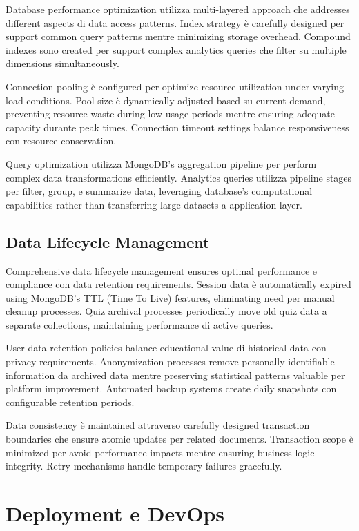 \documentclass[12pt,a4paper]{article}
\begin{document}
Database performance optimization utilizza multi-layered approach che addresses different aspects di data access patterns. Index strategy è carefully designed per support common query patterns mentre minimizing storage overhead. Compound indexes sono created per support complex analytics queries che filter su multiple dimensions simultaneously.

Connection pooling è configured per optimize resource utilization under varying load conditions. Pool size è dynamically adjusted based su current demand, preventing resource waste during low usage periods mentre ensuring adequate capacity durante peak times. Connection timeout settings balance responsiveness con resource conservation.

Query optimization utilizza MongoDB's aggregation pipeline per perform complex data transformations efficiently. Analytics queries utilizza pipeline stages per filter, group, e summarize data, leveraging database's computational capabilities rather than transferring large datasets a application layer.

\subsection{Data Lifecycle Management}

Comprehensive data lifecycle management ensures optimal performance e compliance con data retention requirements. Session data è automatically expired using MongoDB's TTL (Time To Live) features, eliminating need per manual cleanup processes. Quiz archival processes periodically move old quiz data a separate collections, maintaining performance di active queries.

User data retention policies balance educational value di historical data con privacy requirements. Anonymization processes remove personally identifiable information da archived data mentre preserving statistical patterns valuable per platform improvement. Automated backup systems create daily snapshots con configurable retention periods.

Data consistency è maintained attraverso carefully designed transaction boundaries che ensure atomic updates per related documents. Transaction scope è minimized per avoid performance impacts mentre ensuring business logic integrity. Retry mechanisms handle temporary failures gracefully.

\section{Deployment e DevOps}
\end{document}
